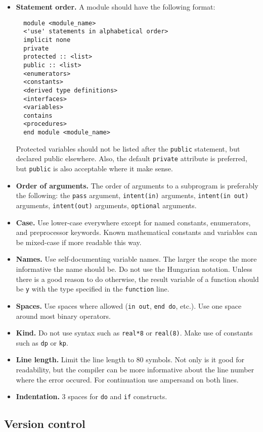 \documentclass{article}
\begin{document}
\begin{itemize}
\item \textbf{Statement order.} A module should have the following format:
\begin{verbatim}
  module <module_name>
  <'use' statements in alphabetical order>
  implicit none
  private
  protected :: <list>
  public :: <list>
  <enumerators>
  <constants>
  <derived type definitions>
  <interfaces>
  <variables>
  contains
  <procedures>
  end module <module_name>
\end{verbatim}
  Protected variables should not be listed after the \texttt{public} statement, but declared public elsewhere. Also, the default \texttt{private} attribute is preferred, but \texttt{public} is also acceptable where it make sense.
\item \textbf{Order of arguments.} The order of arguments to a subprogram is preferably the following: the \texttt{pass} argument, \texttt{intent(in)} arguments, \texttt{intent(in out)} arguments, \texttt{intent(out)} arguments, \texttt{optional} arguments.
\item \textbf{Case.} Use lower-case everywhere except for named constants, enumerators, and preprocessor keywords. Known mathematical constants and variables can be mixed-case if more readable this way.
\item \textbf{Names.} Use self-documenting variable names. The larger the scope the more informative the name should be. Do not use the Hungarian notation. Unless there is a good reason to do otherwise, the result variable of a function should be \texttt{y} with the type specified in the \texttt{function} line.
\item \textbf{Spaces.} Use spaces where allowed (\texttt{in out}, \texttt{end do}, etc.). Use one space around most binary operators.
\item \textbf{Kind.} Do not use syntax such as \texttt{real*8} or \texttt{real(8)}. Make use of constants such as \texttt{dp} or \texttt{kp}.
\item \textbf{Line length.} Limit the line length to 80 symbols. Not only is it good for readability, but the compiler can be more informative about the line number where the error occured. For continuation use ampersand on both lines.
\item \textbf{Indentation.} 3 spaces for \texttt{do} and \texttt{if} constructs.
\end{itemize}

\subsection{Version control}
\end{document}
